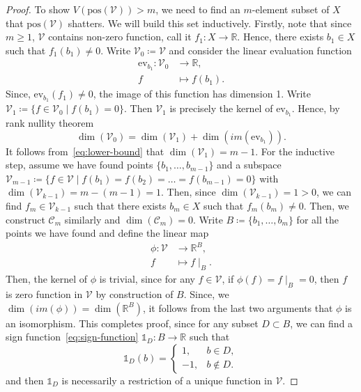 \begin{proof}
    To show $V(\text{pos}(\mathcal{V})) > m $, we need to find an $m$-element subset of $X$ that $\text{pos}(\mathcal{V})$ shatters. We will build this set inductively. Firstly, note that since $m \geq 1$, $\mathcal{V}$ contains non-zero function, call it $f_1: X \to \mathbb{R}$. Hence, there exists $b_1 \in X$ such that $f_1(b_1) \neq 0$. Write $\mathcal{V}_0 \coloneq \mathcal{V}$ and consider the linear evaluation function
    \[
        \begin{aligned}
            \text{ev}_{b_1}: \mathcal{V}_0 &\to \mathbb{R}, \\
            f &\mapsto f(b_1).
        \end{aligned}
    \]
    Since, $\text{ev}_{b_1}(f_1) \neq 0$, the image of this function has dimension 1. Write $\mathcal{V}_1 \coloneq \{f \in \mathcal{V}_0 \mid f(b_1) = 0\}$. Then $\mathcal{V}_1$ is precisely the kernel of $\text{ev}_{b_1}$. Hence, by rank nullity theorem
    \begin{equation}
        \label{eq:lower-bound}
        \dim(\mathcal{V}_0) = \dim(\mathcal{V}_1) + \dim(im(\text{ev}_{b_1})).
    \end{equation}
    It follows from~\ref{eq:lower-bound} that $\dim(\mathcal{V}_1) = m - 1$. For the inductive step, assume we have found points $\{b_1, \dots, b_{m-1}\}$ and a subspace $\mathcal{V}_{m-1} \coloneq \{f \in \mathcal{V} \mid f(b_1) = f(b_2) = \dots = f(b_{m-1}) = 0\}$ with $\dim(\mathcal{V}_{k-1}) = m - (m - 1) = 1$. Then, since $\dim(\mathcal{V}_{k-1}) = 1 > 0$, we can find $f_m \in \mathcal{V}_{k-1}$ such that there exists $b_m \in X$ such that $f_m(b_m) \neq 0$. Then, we construct $\mathcal{C}_m$ similarly and $\dim(\mathcal{C}_m) = 0$. Write $B \coloneq \{b_1, \dots, b_m\}$ for all the points we have found and define the linear map
    \[
        \begin{aligned}
            \phi: \mathcal{V} &\to \mathbb{R}^B, \\
            f &\mapsto f\mid_B.
        \end{aligned}
    \]
    Then, the kernel of $\phi$ is trivial, since for any $f \in \mathcal{V}$, if $\phi(f) = f\mid_B = 0$, then $f$ is zero function in $\mathcal{V}$ by construction of $B$. Since, we $\dim(im(\phi)) = \dim(\mathbb{R}^B)$, it follows from the last two arguments that $\phi$ is an isomorphism. This completes proof, since for any subset $D \subset B$, we can find a sign function~\ref{eq:sign-function} $\mathds{1}_D: B \to \mathbb{R}$ such that
    \[
        \mathds{1}_D(b) =
        \begin{cases}
            1,  & b\in D,\\
            -1, & b\notin D.
        \end{cases}
    \]
    and then $\mathds{1}_D$ is necessarily a restriction of a unique function in $\mathcal{V}$.
\end{proof}

